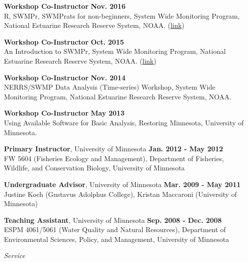 \documentclass[letterpaper,12pt]{article}
\newcommand{\sectitle}[1]{\vspace{\baselineskip} \centerline{\large{\textit{#1}}}}
\begin{document}
{\bf Workshop Co-Instructor} \hfill {\bf Nov. 2016}\\
R, SWMPr, SWMPrats for non-beginners, System Wide Monitoring Program, National Estuarine Research Reserve System, NOAA. ({\footnotesize\href{http://swmprats.net/2016-workshop}{link}})

{\bf Workshop Co-Instructor} \hfill {\bf Oct. 2015}\\
An Introduction to SWMPr, System Wide Monitoring Program, National Estuarine Research Reserve System, NOAA. ({\footnotesize\href{http://swmprats.net/workshop-2015}{link}})

{\bf Workshop Co-Instructor} \hfill {\bf Nov. 2014}\\
NERRS/SWMP Data Analysis (Time-series) Workshop, System Wide Monitoring Program, National Estuarine Research Reserve System, NOAA.

{\bf Workshop Co-Instructor} \hfill {\bf May 2013} \\
Using Available Software for Basic Analysis, Restoring Minnesota, University of Minnesota.

{\bf Primary Instructor}, University of Minnesota \hfill {\bf Jan. 2012 - May 2012} \\
FW 5604 (Fisheries Ecology and Management), Department of Fisheries, Wildlife, and Conservation Biology, University of Minnesota

{\bf Undergraduate Advisor}, University of Minnesota \hfill {\bf Mar. 2009 - May 2011} \\
Justine Koch (Gustavus Adolphus College), Kristan Maccaroni (University of Minnesota)

{\bf Teaching Assistant}, University of Minnesota \hfill {\bf Sep. 2008 - Dec. 2008} \\
ESPM 4061/5061 (Water Quality and Natural Resources), Department of Environmental Sciences, Policy, and Management, University of Minnesota

\sectitle{Service}
\end{document}

